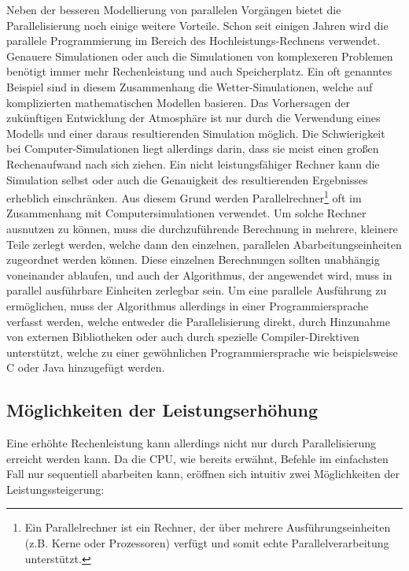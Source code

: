 		Neben der besseren Modellierung von parallelen Vorgängen bietet die Parallelisierung noch einige weitere Vorteile. Schon seit einigen Jahren wird die parallele Programmierung im Bereich des Hochleistungs-Rechnens verwendet. Genauere Simulationen oder auch die Simulationen von komplexeren Problemen benötigt immer mehr Rechenleistung und auch Speicherplatz. Ein oft genanntes Beispiel sind in diesem Zusammenhang die Wetter-Simulationen, welche auf komplizierten mathematischen Modellen basieren. Das Vorhersagen der zukünftigen Entwicklung der Atmosphäre ist nur durch die Verwendung eines Modells und einer daraus resultierenden Simulation möglich.
		Die Schwierigkeit bei Computer-Simulationen liegt allerdings darin, dass sie meist einen großen Rechenaufwand nach sich ziehen. Ein nicht leistungsfähiger Rechner kann die Simulation selbst oder auch die Genauigkeit des resultierenden Ergebnisses erheblich einschränken. Aus diesem Grund werden Parallelrechner\footnote{Ein Parallelrechner ist ein Rechner, der über mehrere Ausführungseinheiten (z.B. Kerne oder Prozessoren) verfügt und somit echte Parallelverarbeitung unterstützt.} oft im Zusammenhang mit Computersimulationen verwendet. Um solche Rechner ausnutzen zu können, muss die durchzuführende Berechnung in mehrere, kleinere Teile zerlegt werden, welche dann den einzelnen, parallelen Abarbeitungseinheiten zugeordnet werden können. Diese einzelnen Berechnungen sollten unabhängig voneinander ablaufen, und auch der Algorithmus, der angewendet wird, muss in parallel ausführbare Einheiten zerlegbar sein. Um eine parallele Ausführung zu ermöglichen, muss der Algorithmus allerdings in einer Programmiersprache verfasst werden, welche entweder die Parallelisierung direkt, durch Hinzunahme von externen Bibliotheken oder auch durch spezielle Compiler-Direktiven unterstützt, welche zu einer gewöhnlichen Programmiersprache wie beispielsweise C oder Java hinzugefügt werden. \cite{ParaProgRauber}\\
		
		\subsection{Möglichkeiten der Leistungserhöhung}
		\label{MoeglichkeitenLeistungserhoehung}
		
			Eine erhöhte Rechenleistung kann allerdings nicht nur durch Parallelisierung erreicht werden kann. Da die CPU, wie bereits erwähnt, Befehle im einfachsten Fall nur sequentiell abarbeiten kann, eröffnen sich intuitiv zwei Möglichkeiten der Leistungssteigerung:
		
